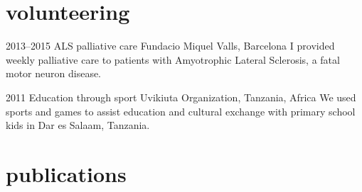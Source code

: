 \documentclass[]{friggeri-cv} %
\begin{document}

\section{volunteering}

\begin{entrylist}


\entry
{2013--2015}
{ALS palliative care}
{Fundacio Miquel Valls, Barcelona}
{I provided weekly palliative care to patients with Amyotrophic
  Lateral Sclerosis, a fatal motor neuron disease.}


\entry
{2011}
{Education through sport}
{Uvikiuta Organization, Tanzania, Africa}
{We used sports and games to assist education and cultural exchange with
  primary school kids in Dar es Salaam, Tanzania.}


\end{entrylist}

\newpage



\section{publications}


\begin{refsection} 
\nocite{*}
\printbibliography[sorting=chronological, type=inproceedings,
  title={Conference papers}, heading=subbibnumbered]
\end{refsection}



\end{document}
